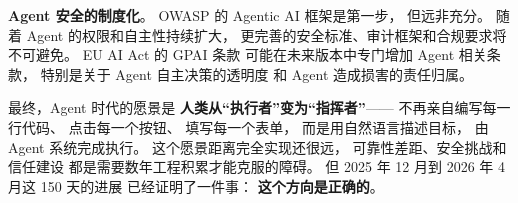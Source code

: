 \textbf{Agent 安全的制度化}。
OWASP 的 Agentic AI 框架是第一步，
但远非充分。
随着 Agent 的权限和自主性持续扩大，
更完善的安全标准、审计框架和合规要求将不可避免。
EU AI Act 的 GPAI 条款
可能在未来版本中专门增加 Agent 相关条款，
特别是关于 Agent 自主决策的透明度
和 Agent 造成损害的责任归属。

最终，Agent 时代的愿景是
\textbf{人类从“执行者”变为“指挥者”}——
不再亲自编写每一行代码、
点击每一个按钮、
填写每一个表单，
而是用自然语言描述目标，
由 Agent 系统完成执行。
这个愿景距离完全实现还很远，
可靠性差距、安全挑战和信任建设
都是需要数年工程积累才能克服的障碍。
但 2025 年 12 月到 2026 年 4 月这 150 天的进展
已经证明了一件事：
\textbf{这个方向是正确的}。


